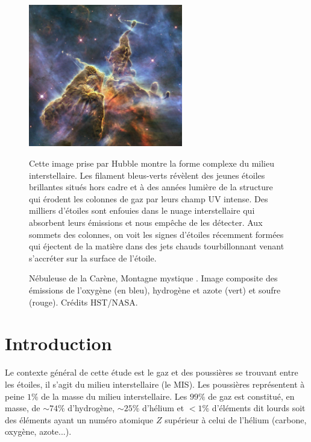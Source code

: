 \documentclass[11pt,a4paper,twoside,openright]{article}
\begin{document}
\begin{spacing}{0.98}
\begin{figure}[!p]
    \centering
    \includegraphics[width = 0.6\textwidth]{figure/mystic.pdf}
    \caption{Nébuleuse de la Carène, \og Montagne mystique \fg{}. Image composite des émissions de l’oxygène (en bleu), hydrogène et azote (vert) et soufre (rouge). Crédits HST/NASA.}
    \vspace{1em}
    \begin{minipage}{\textwidth}
    Cette image prise par Hubble montre la forme complexe du milieu interstellaire. Les filament bleus-verts révèlent des jeunes étoiles brillantes situés hors cadre et à des années lumière de la structure qui érodent les colonnes de gaz par leurs champ UV intense. Des milliers d'étoiles sont enfouies dans le nuage interstellaire qui absorbent leurs émissions et nous empêche de les détecter. Aux sommets des colonnes, on voit les signes d'étoiles récemment formées qui éjectent de la matière dans des jets chauds tourbillonnant venant s'accréter sur la surface de l'étoile.
    \end{minipage}
    \label{fig:intro:mystic}
\end{figure}
 
 

\newpage
\setcounter{secnumdepth}{-1}
\part{Introduction}


Le contexte général de cette étude est le gaz et des poussières se trouvant entre les étoiles, il s'agit du milieu interstellaire (le MIS). Les poussières représentent à peine $1\%$ de la masse du milieu interstellaire. Les $99\%$ de gaz est constitué, en masse, de $\sim 74\%$ d'hydrogène, $\sim 25\%$ d'hélium et $<1\%$ d'éléments dit \og lourds \fg{} soit des éléments ayant un numéro atomique $Z$ supérieur à celui de l'hélium (carbone, oxygène, azote...).\newline 


\end{spacing}
\end{document}
